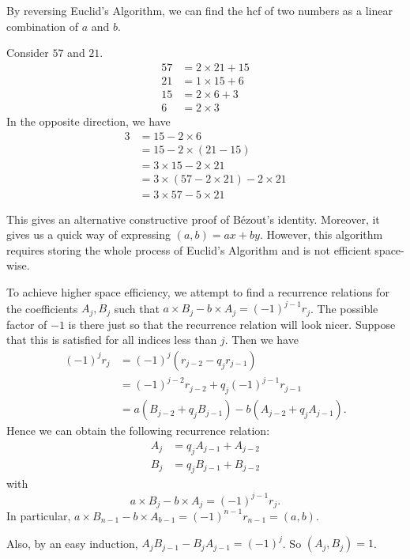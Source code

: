 \documentclass[a4paper]{article}
\begin{document}
By reversing Euclid's Algorithm, we can find the hcf of two numbers as a linear combination of $a$ and $b$.
\begin{eg}
  Consider $57$ and $21$.
  \begin{align*}
    57 &= 2\times 21 + 15\\
    21 &= 1\times 15 + 6\\
    15 &= 2\times 6 + 3\\
    6 &= 2\times 3
  \end{align*}
  In the opposite direction, we have
  \begin{align*}
    3 &= 15 - 2\times 6\\
    &= 15 - 2\times (21 - 15)\\
    &= 3\times 15 - 2\times 21\\
    &= 3\times (57 - 2\times 21) - 2\times 21\\
    &= 3\times 57 - 5\times 21
  \end{align*}
\end{eg}

This gives an alternative constructive proof of B\'{e}zout's identity. Moreover, it gives us a quick way of expressing $(a, b) = ax + by$. However, this algorithm requires storing the whole process of Euclid's Algorithm and is not efficient space-wise.

To achieve higher space efficiency, we attempt to find a recurrence relations for the coefficients $A_j, B_j$ such that $a\times B_j - b \times A_j = (-1)^{j - 1}r_j$. The possible factor of $-1$ is there just so that the recurrence relation will look nicer. Suppose that this is satisfied for all indices less than $j$. Then we have
\begin{align*}
  (-1)^jr_{j} &= (-1)^j(r_{j - 2} - q_jr_{j - 1})\\
  &= (-1)^{j - 2} r_{j - 2} + q_j (-1)^{j - 1} r_{j - 1}\\
  &= a (B_{j - 2} + q_j B_{j - 1}) - b (A_{j - 2} + q_j A_{j - 1}).
\end{align*}
Hence we can obtain the following recurrence relation:
\begin{align*}
  A_j &= q_jA_{j-1} + A_{j-2}\\
  B_j &= q_jB_{j-1} + B_{j-2}
\end{align*}
with
\[
  a\times B_j - b\times A_j = (-1)^{j-1}r_j.
\]
In particular, $a\times B_{n-1} - b\times A_{b-1} = (-1)^{n-1}r_{n - 1} = (a, b)$.

Also, by an easy induction, $A_jB_{j - 1} - B_jA_{j-1} = (-1)^j$. So $(A_j, B_j) = 1$.
\end{document}

